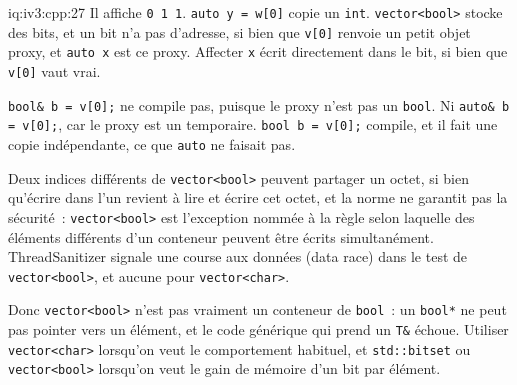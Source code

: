 \begin{solution}{iq:iv3:cpp:27}
Il affiche \texttt{0 1 1}. \texttt{auto y = w[0]} copie un \texttt{int}. \texttt{vector<bool>} stocke des bits, et un bit n'a pas d'adresse, si bien que \texttt{v[0]} renvoie un petit objet proxy, et \texttt{auto x} est ce proxy. Affecter \texttt{x} écrit directement dans le bit, si bien que \texttt{v[0]} vaut vrai.

\texttt{bool\& b = v[0];} ne compile pas, puisque le proxy n'est pas un \texttt{bool}. Ni \texttt{auto\& b = v[0];}, car le proxy est un temporaire. \texttt{bool b = v[0];} compile, et il fait une copie indépendante, ce que \texttt{auto} ne faisait pas.

Deux indices différents de \texttt{vector<bool>} peuvent partager un octet, si bien qu'écrire dans l'un revient à lire et écrire cet octet, et la norme ne garantit pas la sécurité~: \texttt{vector<bool>} est l'exception nommée à la règle selon laquelle des éléments différents d'un conteneur peuvent être écrits simultanément. ThreadSanitizer signale une course aux données (data race) dans le test de \texttt{vector<bool>}, et aucune pour \texttt{vector<char>}.

Donc \texttt{vector<bool>} n'est pas vraiment un conteneur de \texttt{bool}~: un \texttt{bool*} ne peut pas pointer vers un élément, et le code générique qui prend un \texttt{T\&} échoue. Utiliser \texttt{vector<char>} lorsqu'on veut le comportement habituel, et \texttt{std::bitset} ou \texttt{vector<bool>} lorsqu'on veut le gain de mémoire d'un bit par élément.

\end{solution}

